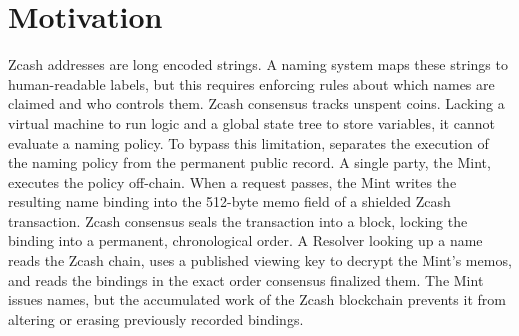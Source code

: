 \section{Motivation}
\label{sec:motivation}

Zcash addresses are long encoded strings. A naming system maps these strings to human-readable labels, but this requires enforcing rules about which names are claimed and who controls them. Zcash consensus tracks unspent coins. Lacking a virtual machine to run logic and a global state tree to store variables, it cannot evaluate a naming policy. To bypass this limitation, \zns{} separates the execution of the naming policy from the permanent public record. A single party, the Mint, executes the policy off-chain. When a request passes, the Mint writes the resulting name binding into the 512-byte memo field of a shielded Zcash transaction. Zcash consensus seals the transaction into a block, locking the binding into a permanent, chronological order. A Resolver looking up a name reads the Zcash chain, uses a published viewing key to decrypt the Mint's memos, and reads the bindings in the exact order consensus finalized them. The Mint issues names, but the accumulated work of the Zcash blockchain prevents it from altering or erasing previously recorded bindings.
